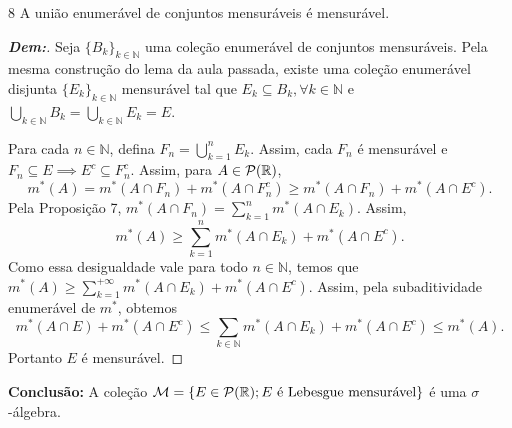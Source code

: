 \begin{prop*}{8}
A união enumerável de conjuntos mensuráveis é mensurável.
\end{prop*}

\begin{proof}[\textbf{Dem:}]
Seja $\{B_k\}_{k \in \mathbb{N}}$ uma coleção enumerável de conjuntos mensuráveis. Pela mesma construção do lema da aula passada, existe uma coleção enumerável disjunta $\{E_k\}_{k \in \mathbb{N}}$ mensurável tal que $E_k \subseteq B_k, \forall k \in \mathbb{N}$ e $\bigcup_{k \in \mathbb{N}} B_k = \bigcup_{k \in \mathbb{N}} E_k = E$.

Para cada $n \in \mathbb{N}$, defina $F_n = \bigcup_{k=1}^n E_k$. Assim, cada $F_n$ é mensurável e $F_n \subseteq E \implies E^c \subseteq F_n^c$.
Assim, para $A \in \mathcal{P}(\mathbb{R})$,
$$ m^*(A) = m^*(A \cap F_n) + m^*(A \cap F_n^c) \ge m^*(A \cap F_n) + m^*(A \cap E^c). $$
Pela Proposição 7, $m^*(A \cap F_n) = \sum_{k=1}^n m^*(A \cap E_k)$. Assim, 
$$ m^*(A) \ge \sum_{k=1}^n m^*(A \cap E_k) + m^*(A \cap E^c). $$
Como essa desigualdade vale para todo $n \in \mathbb{N}$, temos que $m^*(A) \ge \sum_{k=1}^{+\infty} m^*(A \cap E_k) + m^*(A \cap E^c)$.
Assim, pela subaditividade enumerável de $m^*$, obtemos
$$ m^*(A \cap E) + m^*(A \cap E^c) \le \sum_{k \in \mathbb{N}} m^*(A \cap E_k) + m^*(A \cap E^c) \le m^*(A). $$
Portanto $E$ é mensurável.
\end{proof}

\bigline
\noindent
\textbf{Conclusão:} A coleção $\mathcal{M} = \{E \in \mathcal{P}(\mathbb{R}) ; E \text{ é Lebesgue mensurável}\}$ é uma $\sigma$-álgebra.
